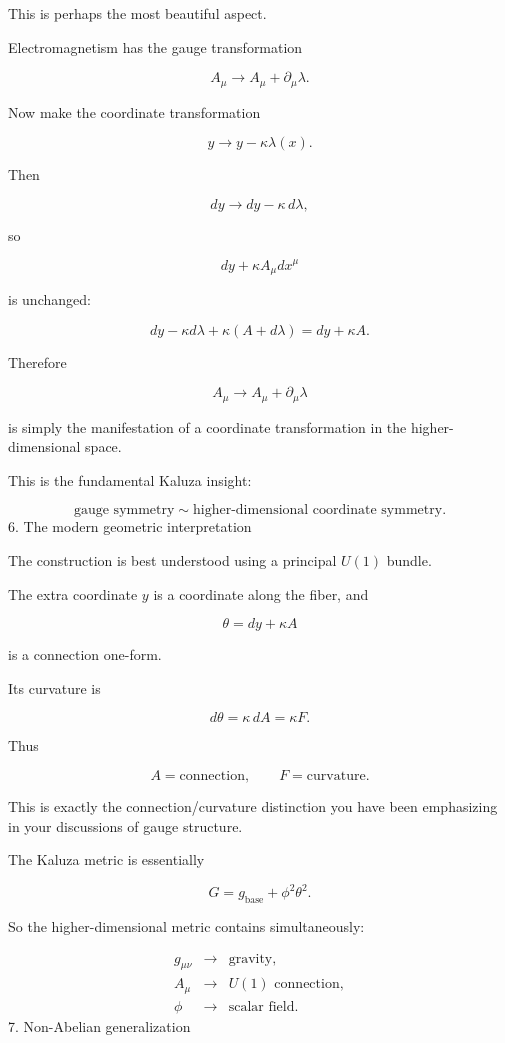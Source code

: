 This is perhaps the most beautiful aspect.

Electromagnetism has the gauge transformation

$$ A_\mu\rightarrow A_\mu+\partial_\mu\lambda. $$

Now make the coordinate transformation

$$ \boxed{ y\rightarrow y-\kappa\lambda(x). } $$

Then

$$ dy\rightarrow dy-\kappa\,d\lambda, $$

so

$$ dy+\kappa A_\mu dx^\mu $$

is unchanged:

$$ dy-\kappa d\lambda + \kappa(A+d\lambda) = dy+\kappa A. $$

Therefore

$$ A_\mu\rightarrow A_\mu+\partial_\mu\lambda $$

is simply the manifestation of a coordinate transformation in the higher-dimensional space.

This is the fundamental Kaluza insight:

$$ \boxed{ \text{gauge symmetry} \sim \text{higher-dimensional coordinate symmetry}. } $$
6. The modern geometric interpretation

The construction is best understood using a principal \(U(1)\) bundle.

The extra coordinate \(y\) is a coordinate along the fiber, and

$$ \boxed{ \theta=dy+\kappa A } $$

is a connection one-form.

Its curvature is

$$ d\theta = \kappa\,dA = \kappa F. $$

Thus

$$ \boxed{ A = \text{connection}, \qquad F = \text{curvature}. } $$

This is exactly the connection/curvature distinction you have been emphasizing in your discussions of gauge structure.

The Kaluza metric is essentially

$$ \boxed{ G = g_{\text{base}} + \phi^2\theta^2. } $$

So the higher-dimensional metric contains simultaneously:

$$ \begin{array}{ccl} g_{\mu\nu}&\rightarrow&\text{gravity},\\ A_\mu&\rightarrow&U(1)\text{ connection},\\ \phi&\rightarrow&\text{scalar field}. \end{array} $$
7. Non-Abelian generalization

